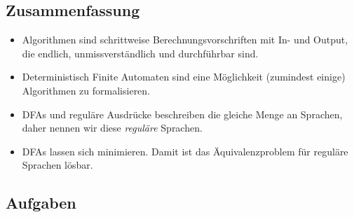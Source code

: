 \subsection*{Zusammenfassung}
\begin{itemize}
    \item Algorithmen sind schrittweise Berechnungsvorschriften mit In- und Output,
        die endlich, unmissverständlich und durchführbar sind.
    \item Deterministisch Finite Automaten sind eine Möglichkeit (zumindest einige)
        Algorithmen zu formalisieren.
    \item DFAs und reguläre Ausdrücke beschreiben die gleiche Menge an Sprachen,
        daher nennen wir diese \emph{reguläre} Sprachen.
    \item DFAs lassen sich minimieren.
        Damit ist das Äquivalenzproblem für reguläre Sprachen lösbar.
\end{itemize}

\subsection*{Aufgaben}

